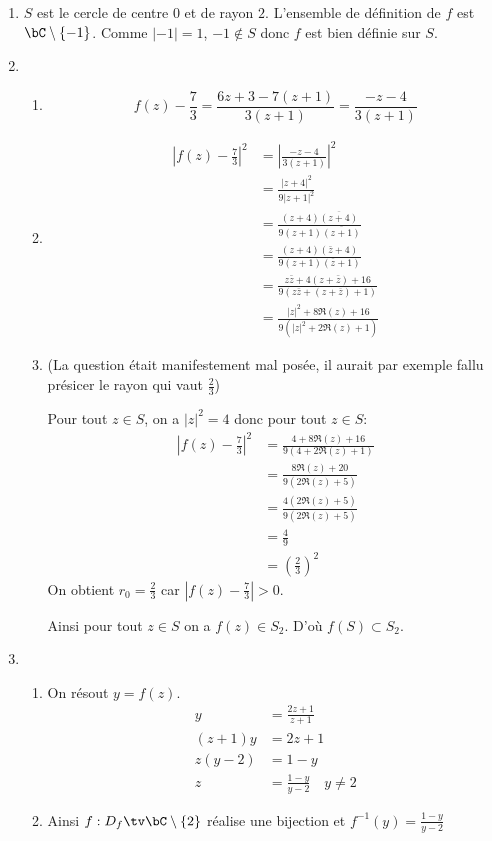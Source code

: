 \begin{correction}
\begin{enumerate}
\item $S$ est le cercle de centre $0$ et de rayon $2$. L'ensemble de définition de $f$ est $\bC\setminus \{ -1\}$. Comme $|-1|=1$, $-1\notin S$ donc $f$ est bien définie sur $S$. 
\item 
\begin{enumerate}
\item $$f(z)-\frac{7}{3}= \frac{6z+3 - 7(z+1)}{3(z+1)} = \frac{-z -4}{3(z+1)}$$
\item
\begin{align*}
\left| f(z) -\frac{7}{3}\right|^2 &= \left| \frac{-z -4}{3(z+1)}\right|^2\\
												&=  \frac{ |z +4|^2}{9|z+1|^2}\\
												&=  \frac{ (z +4)\overline{(z +4)}}{9(z+1)\overline{(z+1)}}\\
												&=  \frac{ (z +4)(\bar{z} +4)}{9(z+1)(\overline{z}+1)}\\
												&=  \frac{ z\bar{z}  +4(z+\bar{z} )+16}{9(z\bar{z} +(z+\overline{z})+1)}\\
												&=\frac{ |z|^2  +8\Re(z)+16}{9(|z|^2  +2\Re(z)+1)}
\end{align*}

\item  (La question était manifestement mal posée, il aurait par exemple fallu présicer le rayon qui vaut $\frac{2}{3}$) 

 Pour tout $z\in S$, on  a $|z|^2=4$ donc pour tout $z\in S$:
\begin{align*}
\left| f(z) -\frac{7}{3}\right|^2 &=\frac{ 4  +8\Re(z)+16}{9(4 +2\Re(z)+1)}\\
												&=\frac{ 8\Re(z)+20}{9( 2\Re(z)+5)}\\
												&=\frac{4 (2\Re(z)+5)}{9( 2\Re(z)+5)}\\
												&= \frac{4}{9}\\
												&=\left(\frac{2}{3}\right)^2
\end{align*}
On obtient $r_0=\frac{2}{3}$ car $\left| f(z) -\frac{7}{3}\right|>0$. 

Ainsi pour tout $z\in S$ on a $f(z) \in S_2$. D'où $f(S) \subset S_2$. 

\end{enumerate}
\item 
\begin{enumerate}
\item On résout $y = f(z) $. 
\begin{align*}
y&= \frac{2z+1}{z+1}\\
(z+1)y &= 2z+1\\
z(y-2) &= 1-y\\
z &= \frac{1-y}{y-2}\quad y\neq 2
\end{align*}
\item Ainsi $f : D_f \tv \bC\setminus \{ 2\} $ réalise une bijection et $f^{-1} (y) =\frac{1-y}{y-2}$


\end{enumerate}
\end{enumerate}
\end{correction}
